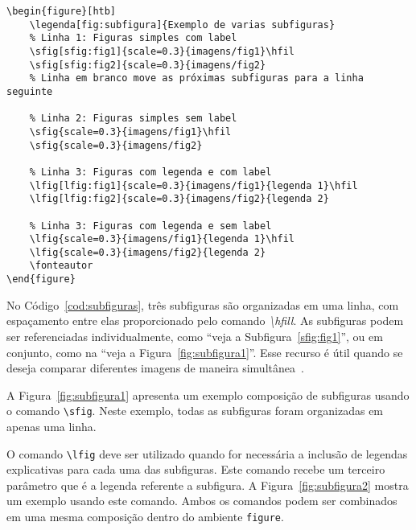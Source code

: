 \documentclass[
    12pt
    ,oneside
    ,a4paper
    ,chapter=TITLE
    ,section=TITLE
    ,sumario=abnt-6027-2012]{abntex2}
\begin{document}
\begin{codigo}[htb]
\begin{lstlisting}
\begin{figure}[htb]
    \legenda[fig:subfigura]{Exemplo de varias subfiguras}
    % Linha 1: Figuras simples com label
    \sfig[sfig:fig1]{scale=0.3}{imagens/fig1}\hfil
    \sfig[sfig:fig2]{scale=0.3}{imagens/fig2}
    % Linha em branco move as próximas subfiguras para a linha seguinte

    % Linha 2: Figuras simples sem label
    \sfig{scale=0.3}{imagens/fig1}\hfil
    \sfig{scale=0.3}{imagens/fig2}

    % Linha 3: Figuras com legenda e com label
    \lfig[lfig:fig1]{scale=0.3}{imagens/fig1}{legenda 1}\hfil
    \lfig[lfig:fig2]{scale=0.3}{imagens/fig2}{legenda 2}

    % Linha 3: Figuras com legenda e sem label
    \lfig{scale=0.3}{imagens/fig1}{legenda 1}\hfil
    \lfig{scale=0.3}{imagens/fig2}{legenda 2}
    \fonteautor
\end{figure}
\end{lstlisting}
\fonteautor
\end{codigo}

No Código~\ref{cod:subfiguras}, três subfiguras são organizadas em uma linha, com espaçamento entre elas proporcionado pelo comando \textit{\textbackslash hfill}. As subfiguras podem ser referenciadas individualmente, como ``veja a Subfigura~\ref{sfig:fig1}'', ou em conjunto, como na ``veja a Figura~\ref{fig:subfigura1}''. Esse recurso é útil quando se deseja comparar diferentes imagens de maneira simultânea~\cite{goossens1997latex}.

A Figura~\ref{fig:subfigura1} apresenta um exemplo composição de subfiguras usando o comando \texttt{\textbackslash sfig}. Neste exemplo, todas as subfiguras foram organizadas em apenas uma linha.

\begin{figure}[htb]
    \hfil
    \hfil
    \hfil
\end{figure}

O comando \texttt{\textbackslash lfig} deve ser utilizado quando for necessária a inclusão de legendas explicativas para cada uma das subfiguras. Este comando recebe um terceiro parâmetro que é a legenda referente a subfigura. A Figura~\ref{fig:subfigura2} mostra um exemplo usando este comando. Ambos os comandos podem ser combinados em uma mesma composição dentro do ambiente \texttt{figure}. 
\end{document}
